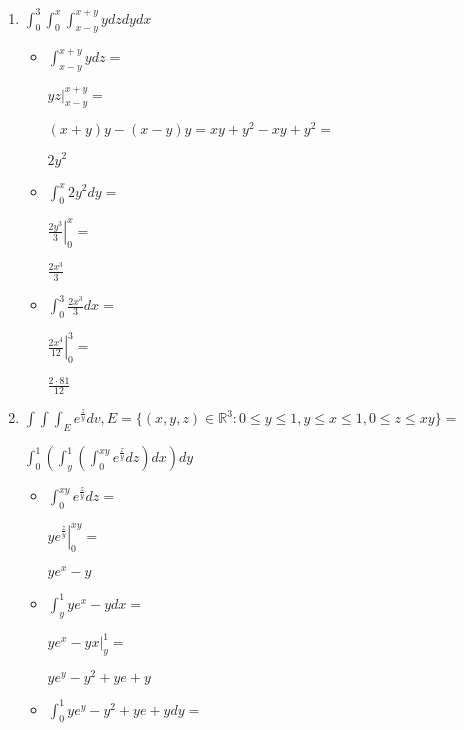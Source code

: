 \documentclass[../practica_08.tex]{subfiles}
\begin{document}
    \begin{enumerate}
        \item $\int_0^3 \int_0^x \int_{x-y}^{x+y} y dz dy dx$
        
            \begin{itemize}
                \item $ \int_{x-y}^{x+y} y dz = $
                
                    $\left.  yz \right |_{x-y}^{x+y} =$

                    $ (x+y)y - (x-y)y = xy + y^2 - xy + y^2 = $

                    $ 2y^2 $

                \item $ \int_0^x 2y^2 dy =  $
                
                    $\left. \frac{2y^3}{3} \right |_0^x = $

                    $ \frac{2x^3}{3} $

                \item $ \int_0^3 \frac{2x^3}{3} dx = $
                
                    $ \left. \frac{2x^4}{12} \right |_0^3 = $

                    $ \frac{2 \cdot 81}{12} $

            \end{itemize}

        \item $\int \int \int_E e^{\frac{z}{y}} dv, E=\{(x,y,z) \in \mathbb{R}^3: 0 \leq y \leq 1, y \leq x \leq 1, 0 \leq z \leq xy \} = $
        
            $\int_0^1 (\int_y^1 (\int_0^{xy} e^{\frac{z}{y}} dz) dx) dy$
        
            \begin{itemize}
                \item $ \int_0^{xy} e^{\frac{z}{y}} dz = $
                
                    $\left. ye^{\frac{z}{y}} \right |_0^{xy} = $

                    $  ye^{x} - y $

                \item $ \int_y^1 ye^x - y dx = $
                
                    $\left. ye^x - yx \right |_y^1 = $

                    $ ye^y - y^2 + ye + y $

                \item $\int_0^1 ye^y - y^2 + ye + y dy = $
                

\end{itemize}
\end{enumerate}
\end{document}
